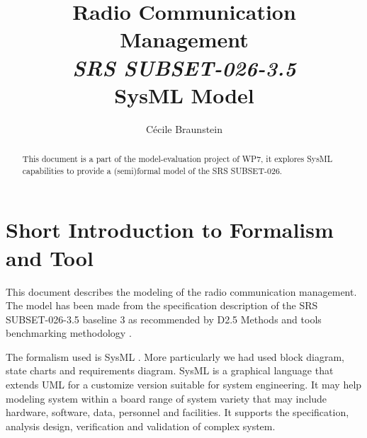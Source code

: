\documentclass{template/openetcs_article}
\begin{document}
\frontmatter
{}





\author{C\'ecile Braunstein}


\title{Radio Communication Management \\
{\it SRS SUBSET-026-3.5} \\SysML Model}




\begin{abstract}
This document is a part of the model-evaluation project of WP7, it explores
SysML capabilities to provide a (semi)formal model of the SRS SUBSET-026.
\end{abstract}
\maketitle
\tableofcontents
\listoffiguresandtables
\newpage

\section{Short Introduction to Formalism and Tool}
\label{sec:short-intr-form}
This document describes the modeling  of the radio communication management. The
model has been made from the specification description of the SRS SUBSET-026-3.5
 baseline 3 as recommended by D2.5 Methods and tools benchmarking methodology
 \cite{D2-5}.


The formalism used  is SysML \cite{SysML}. More particularly we had used
block diagram, state charts and requirements diagram. 
SysML is a graphical language that extends UML for a customize version suitable
for system engineering. It may help modeling system within a board range of
system variety that may include hardware, software, data, personnel and
facilities. It supports the specification, analysis design, verification and
validation of complex system. 
\end{document}
